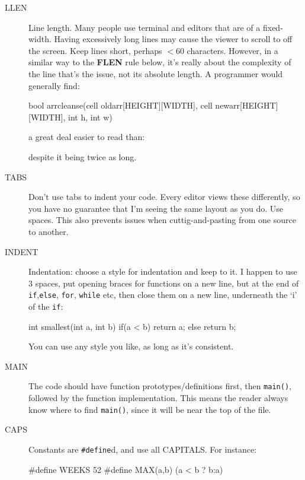 \begin{description}

\item[LLEN] Line length. Many people use terminal and editors that are
of a fixed-width. Having excessively long lines may cause the viewer to scroll to
off the screen. Keep lines short, perhaps $< 60$ characters. However, in a similar way
to the {\bf FLEN} rule below, it's really about the complexity of the line that's the issue,
not its absolute length. A programmer would generally find:
{\small
\begin{codesnippet}
bool arrcleanse(cell oldarr[HEIGHT][WIDTH], cell newarr[HEIGHT][WIDTH], int h, int w)
\end{codesnippet}
}
a great deal easier to read than:
\begin{codesnippet}
if(a < b && j++ >= szpar(e ? true : false) || h==4){
\end{codesnippet}
despite it being twice as long.

\item[TABS] Don't use tabs to indent your code. Every editor views these differently, so you have no guarantee that I'm seeing the same layout as you do. Use spaces. This also prevents issues when cuttig-and-pasting from one source to another.

\item[INDENT] Indentation: choose a style for indentation
and keep to it. I happen to use $3$ spaces, put opening braces
for functions on a new line, but at the end of \verb^if^,\verb^else^, \verb^for^, \verb^while^ etc, then close them on a new line, underneath the `i' of the \verb^if^:
\begin{codesnippet}
int smallest(int a, int b)
{
   if(a < b){
      return a;
   }
   else{
      return b;
   }
}
\end{codesnippet}
You can use any style you like, as long as it's consistent.

\item[MAIN] The code should have function prototypes/definitions first, then \verb^main()^, followed by the function implementation. This means the reader always know where to find \verb^main()^, since it will be near the top of the file.


\item[CAPS] Constants are \verb^#define^d, and use all CAPITALS. For instance:
\begin{codesnippet}
#define WEEKS 52
#define MAX(a,b) (a < b ? b:a)
\end{codesnippet}



\end{description}
